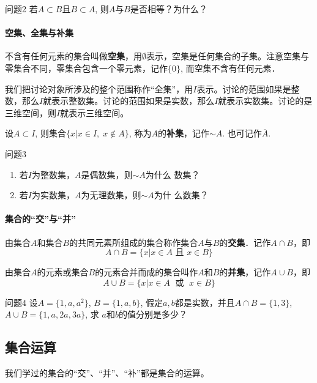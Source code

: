 \begin{blk}{问题2}
    若$A\subset B$且$B\subset A$, 则$A$与$B$是否相等？为什么？
\end{blk}

\paragraph{空集、全集与补集}

不含有任何元素的集合叫做\textbf{空集}，用$\emptyset$表示，空集是任何集合的子集。注意空集与零集合不同，零集合包含一个零元素，记作$\{0\}$, 而空集不含有任何元素．

我们把讨论对象所涉及的整个范围称作“全集”，用$I$表示。讨论的范围如果是整数，那么$I$就表示整数集。讨论的范围如果是实数，那么$I$就表示实数集。讨论的是三维空间，则$I$就表示三维空间。

设$A\subset I$, 则集合$\{x|x\in I,\; x\notin A\}$, 称为$A$的\textbf{补集}，记作$\sim A$. 也可记作$\overline{A}$.

\begin{blk}{问题3}
\begin{enumerate}
    \item 若$I$为整数集，$A$是偶数集，则$\sim A$为什么
数集？
\item 若$I$为实数集，$A$为无理数集，则$\sim A$为什
么数集？
\end{enumerate}
\end{blk}

\paragraph{集合的“交”与“并”}

由集合$A$和集合$B$的共同元素所组成的集合称作集合$A$与$B$的\textbf{交集}．记作$A\cap B$，即
\[A\cap B=\{x|x\in A\text{ 且 }x\in B\}\]

由集合$A$的元素或集合$B$的元素合并而成的集合叫作$A$和$B$的\textbf{并集}，记作$A\cup B$，即
\[A\cup B=\{x|x\in A\; \text{ 或 }\; x\in B\}\]

\begin{blk}{问题4}
    设$A=\{1,a,a^2\}$, $B=\{1,a,b\}$, 假定$a,b$都是实数，并且$A\cap B=\{1, 3\}$, $A\cup B=\{1,a,2a,3a\}$, 求
$a$和$b$的值分别是多少？
\end{blk}


\subsection{集合运算}

我们学过的集合的“交”、“并”、“补”都是集合的运算。

